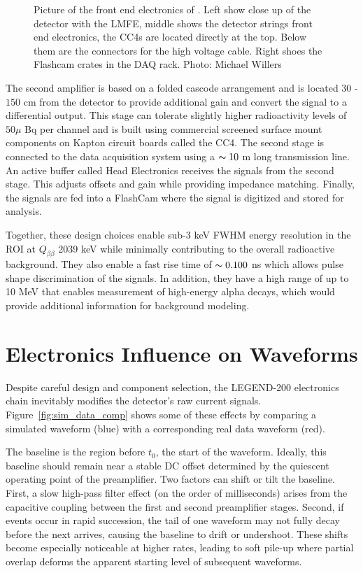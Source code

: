 \begin{figure}[!htb]
    \caption{Picture of the front end electronics of {\Ltwo}. Left show close up of the detector with the LMFE, middle shows the detector strings front end electronics, the CC4s are located directly at the top. Below them are the connectors for the high voltage cable. Right shoes the Flashcam crates in the DAQ rack. Photo: Michael Willers}
   \label{ch6_fig_l200_elec_model_real}
\end{figure}


The second amplifier is based on a folded cascode arrangement and is located $30$ -$150$ cm from the detector to provide additional gain and convert the signal to a differential output. This stage can tolerate slightly higher radioactivity levels of $50\mu$ Bq per channel and is built using commercial screened surface mount components on Kapton circuit boards called the CC4. The second stage is connected to the data acquisition system using a $\thicksim 10$ m long transmission line. An active buffer called Head Electronics receives the signals from the second stage. This adjusts offsets and gain while providing impedance matching. Finally, the signals are fed into a FlashCam where the signal is digitized and stored for analysis.

Together, these design choices enable sub-3 keV FWHM energy resolution in the ROI at $Q_{\beta\beta}$ 2039 keV while minimally contributing to the overall radioactive background. They also enable a fast rise time of $\thicksim 0.100$ ns which allows pulse shape discrimination of the signals. In addition, they have a high range of up to 10 MeV that enables measurement of high-energy alpha decays, which would provide additional information for background modeling.

\section{Electronics Influence on Waveforms}

Despite careful design and component selection, the LEGEND-200 electronics chain inevitably modifies the detector’s raw current signals. Figure~\ref{fig:sim_data_comp} shows some of these effects by comparing a simulated waveform (blue) with a corresponding real data waveform (red).

The baseline is the region before $t_0$, the start of the waveform. Ideally, this baseline should remain near a stable DC offset determined by the quiescent operating point of the preamplifier. Two factors can shift or tilt the baseline. First, a slow high-pass filter effect (on the order of milliseconds) arises from the capacitive coupling between the first and second preamplifier stages. Second, if events occur in rapid succession, the tail of one waveform may not fully decay before the next arrives, causing the baseline to drift or undershoot. These shifts become especially noticeable at higher rates, leading to soft pile-up where partial overlap deforms the apparent starting level of subsequent waveforms. 

